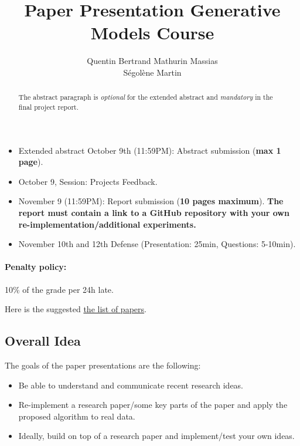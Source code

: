 \documentclass{article}
\title{Paper Presentation Generative Models Course}
\author{%
  Quentin Bertrand
  \And
  Mathurin Massias \\
  \And
  Ségolène Martin
}
\begin{document}
\maketitle

\begin{abstract}
  The abstract paragraph is \emph{optional} for the extended abstract and \emph{mandatory} in the final project report.
\end{abstract}


\begin{itemize}
    \item Extended abstract October 9th (11:59PM): Abstract submission (\textbf{max 1 page}).
    \item October 9, Session: Projects Feedback.
    \item November 9 (11:59PM): Report submission  (\textbf{10 pages maximum}). \textbf{The report must contain a link to a GitHub repository with your own re-implementation/additional experiments.}
    \item November 10th and 12th Defense (Presentation: 25min, Questions: 5-10min).
\end{itemize}
\paragraph{Penalty policy:} 10\% of the grade per 24h late.

Here is the suggested \href{https://docs.google.com/spreadsheets/d/16m-sXLK4lC5WoI5rNj5VY1BBDEIMi2mPbnrz0Ys7EsU/edit?gid=0#gid=0}{the list of papers}.


\subsection{Overall Idea}
The goals of the paper presentations are the following:
\begin{itemize}
    \item Be able to understand and communicate recent research ideas.
    \item Re-implement a research paper/some key parts of the paper and apply the proposed algorithm to real data.  
    \item Ideally, build on top of a research paper and implement/test your own ideas.
\end{itemize}
\end{document}
